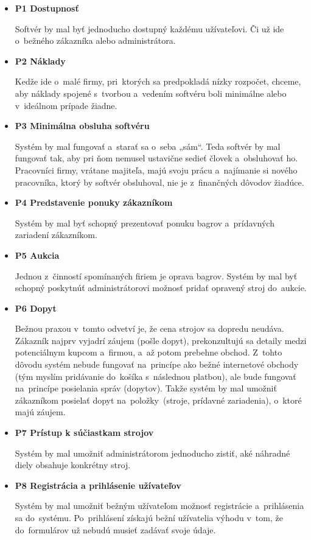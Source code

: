 \begin{itemize}
\item \textbf{P1 Dostupnosť}

Softvér by mal byť jednoducho dostupný každému užívateľovi. Či už ide o~bežného zákazníka alebo administrátora.

\item \textbf{P2 Náklady}

Kedže ide o~malé firmy, pri~ktorých sa predpokladá nízky rozpočet, chceme, aby náklady spojené s~tvorbou a~vedením softvéru boli minimálne alebo v~ideálnom prípade žiadne.

\item \textbf{P3 Minimálna obsluha softvéru}

Systém by mal fungovať a~starať sa o~seba „sám“. Teda softvér by mal fungovať tak, aby pri ňom nemusel ustavične sedieť človek a~obsluhovať ho. Pracovníci firmy, vrátane majiteľa, majú svoju prácu a~najímanie si nového pracovníka, ktorý by softvér obsluhoval, nie je z~finančných dôvodov žiadúce.

\item \textbf{P4 Predstavenie ponuky zákazníkom}

Systém by mal byť schopný prezentovať ponuku bagrov a~prídavných za\-ria\-de\-ní zákazníkom.

\item \textbf{P5 Aukcia}

Jednou z~činností spomínaných firiem je oprava bagrov. Systém by mal byť schopný poskytnúť administrátorovi možnosť pridať opravený stroj do~au\-kci\-e.

\item \textbf{P6 Dopyt}

Bežnou praxou v~tomto odvetví je, že cena strojov sa dopredu neudáva. Zákazník najprv vyjadrí záujem (pošle dopyt), prekonzultujú sa detaily medzi potenciálnym kupcom a~firmou, a~až potom prebehne obchod. Z~tohto dôvodu systém nebude fungovať na~princípe ako bežné internetové obchody (tým myslím pridávanie do~košíka s~následnou platbou), ale bude fungovať na~princípe posielania správ (dopytov). Takže systém by mal umožniť zákazníkom posielať dopyt na~položky~(stroje, prídavné zariadenia), o~ktoré majú záujem.

\item \textbf{P7 Prístup k súčiastkam strojov}

Systém by mal umožniť administrátorom jednoducho zistiť, aké náhradné diely obsahuje konkrétny stroj. 

\item \textbf{P8 Registrácia a prihlásenie užívateľov}

Systém by mal umožniť bežným užívateľom možnosť registrácie a~pri\-hlá\-se\-nia sa do~systému. Po~prihlásení získajú bežní užívatelia výhodu v~tom, že do~formulárov už nebudú musieť zadávať svoje údaje.
\end{itemize}

